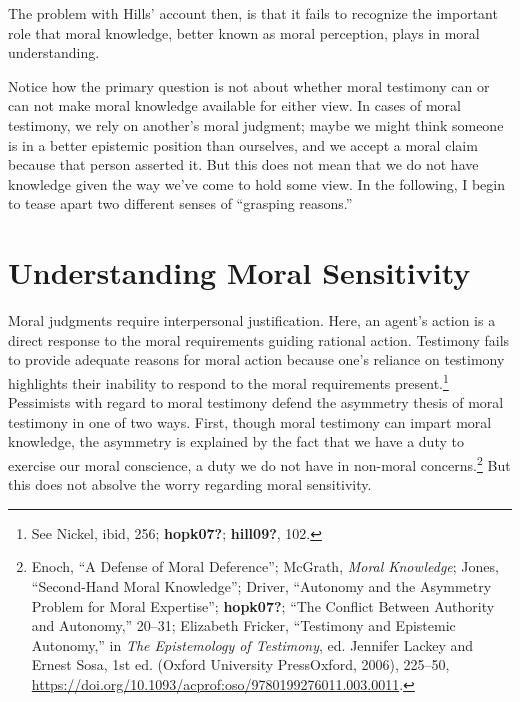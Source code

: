 \documentclass[phdthesis,12pt,final]{wuthesis}
\theoremstyle{definition}
\theoremstyle{definition}
\theoremstyle{definition}
\theoremstyle{definition}
\theoremstyle{remark}
\begin{document}
The problem with Hills' account then, is that it fails to recognize the important role that moral knowledge, better known as moral perception, plays in moral understanding.

Notice how the primary question is not about whether moral testimony can or can not make moral knowledge available for either view. In cases of moral testimony, we rely on another's moral judgment; maybe we might think someone is in a better epistemic position than ourselves, and we accept a moral claim because that person asserted it. But this does not mean that we do not have knowledge given the way we've come to hold some view. In the following, I begin to tease apart two different senses of ``grasping reasons.''

\section{Understanding Moral Sensitivity}\label{understanding-moral-sensitivity}

Moral judgments require interpersonal justification. Here, an agent's action is a direct response to the moral requirements guiding rational action. Testimony fails to provide adequate reasons for moral action because one's reliance on testimony highlights their inability to respond to the moral requirements present.\footnote{See Nickel, ibid, 256; \textbf{hopk07?}; \textbf{hill09?}, 102.} Pessimists with regard to moral testimony defend the asymmetry thesis of moral testimony in one of two ways. First, though moral testimony can impart moral knowledge, the asymmetry is explained by the fact that we have a duty to exercise our moral conscience, a duty we do not have in non-moral concerns.\footnote{Enoch, {``A {Defense} of {Moral Deference}''}; McGrath, \emph{Moral {Knowledge}}; Jones, {``Second-{Hand Moral Knowledge}''}; Driver, {``Autonomy and the {Asymmetry Problem} for {Moral Expertise}''}; \textbf{hopk07?}; {``The {Conflict Between Authority} and {Autonomy},''} 20--31; Elizabeth Fricker, {``Testimony and {Epistemic Autonomy},''} in \emph{The {Epistemology} of {Testimony}}, ed. Jennifer Lackey and Ernest Sosa, 1st ed. (Oxford University PressOxford, 2006), 225--50, \url{https://doi.org/10.1093/acprof:oso/9780199276011.003.0011}.} But this does not absolve the worry regarding moral sensitivity.
\end{document}
